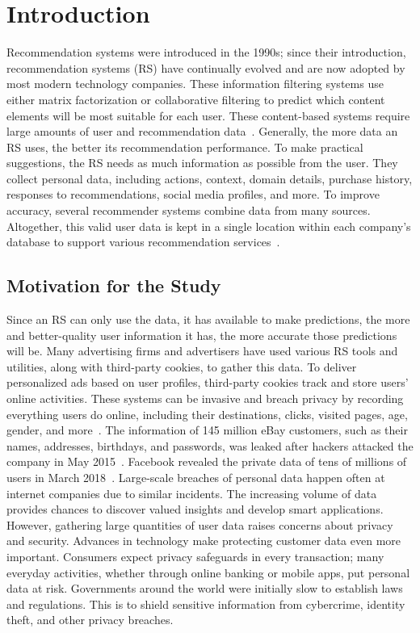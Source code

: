 \chapter{Introduction}
Recommendation systems were introduced in the 1990s; since their introduction, recommendation systems (RS) have continually evolved and are now adopted by most modern technology companies. These information filtering systems use either matrix factorization or collaborative filtering to predict which content elements will be most suitable for each user. These content-based systems require large amounts of user and recommendation data~\cite{ref1}. Generally, the more data an RS uses, the better its recommendation performance. To make practical suggestions, the RS needs as much information as possible from the user. They collect personal data, including actions, context, domain details, purchase history, responses to recommendations, social media profiles, and more. To improve accuracy, several recommender systems combine data from many sources. Altogether, this valid user data is kept in a single location within each company's database to support various recommendation services~\cite{ref2}.

\section{Motivation for the Study}
Since an RS can only use the data, it has available to make predictions, the more and better-quality user information it has, the more accurate those predictions will be. Many advertising firms and advertisers have used various RS tools and utilities, along with third-party cookies, to gather this data. To deliver personalized ads based on user profiles, third-party cookies track and store users' online activities. These systems can be invasive and breach privacy by recording everything users do online, including their destinations, clicks, visited pages, age, gender, and more~\cite{ref2}. The information of 145 million eBay customers, such as their names, addresses, birthdays, and passwords, was leaked after hackers attacked the company in May 2015~\cite{ref91}. Facebook revealed the private data of tens of millions of users in March 2018~\cite{ref92}. Large-scale breaches of personal data happen often at internet companies due to similar incidents. The increasing volume of data provides chances to discover valued insights and develop smart applications. However, gathering large quantities of user data raises concerns about privacy and security. Advances in technology make protecting customer data even more important. Consumers expect privacy safeguards in every transaction; many everyday activities, whether through online banking or mobile apps, put personal data at risk. Governments around the world were initially slow to establish laws and regulations. This is to shield sensitive information from cybercrime, identity theft, and other privacy breaches.

